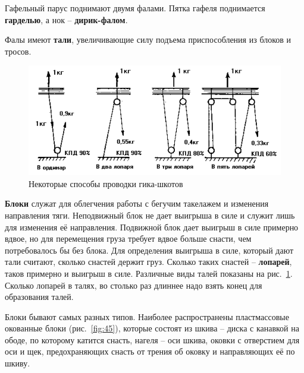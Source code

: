 \documentclass[a4paper, 12pt, twoside, final]{scrbook}
\begin{document}
Гафельный парус поднимают двумя фалами. Пятка гафеля поднимается \textbf{гарделью}, а нок \--- \textbf{дирик-фалом}.

Фалы имеют \textbf{тали}, увеличивающие силу подъема приспособления
из блоков и тросов.

\begin{figure}[htbp]
\begin{centering}
\includegraphics{pics/Provodka_gika-shkotov}
\par\end{centering}

\protect\caption{\label{fig:44}Некоторые способы проводки гика-шкотов}


\end{figure}


\textbf{Блоки} служат для облегчения работы с бегучим такелажем и
изменения направления тяги. Неподвижный блок не дает выигрыша в силе
и служит лишь для изменения её направления. Подвижной блок дает выигрыш
в силе примерно вдвое, но для перемещения груза требует вдвое больше
снасти, чем потребовалось бы без блока. Для определения выигрыша в
силе, который дают тали считают, сколько снастей держит груз. Сколько
таких снастей \--- \textbf{лопарей}, таков примерно и выигрыш в силе. Различные
виды талей показаны на рис.~\ref{fig:44}.
Сколько лопарей в талях, во столько раз длиннее надо взять конец для
образования талей.

Блоки бывают самых разных типов. Наиболее распространены пластмассовые
окованные блоки (рис.~\ref{fig:45}),
которые состоят из шкива \--- диска с канавкой на ободе, по которому катится
снасть, нагеля \--- оси шкива, оковки с отверстием для оси и щек, предохраняющих
снасть от трения об оковку и направляющих её по шкиву.
\end{document}
